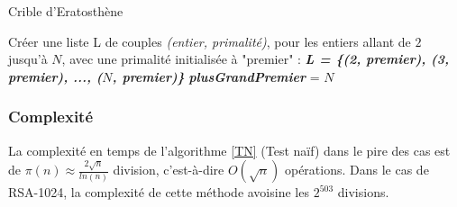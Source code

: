 		\begin{algorithm}[H]
			\caption{Crible d'Eratosthène}\label{Eras}
			{Créer une liste L de couples \textit{(entier, primalité)}, pour les entiers allant de $2$ jusqu'à $N$, avec une primalité initialisée à "premier" : \textit{\textbf{L = \{(2, premier), (3, premier), ..., ($N$, premier)\}}} \;}
			{\textit{\textbf{plusGrandPremier}} = $N$ \;}
		\end{algorithm}	
			
			
		\subsubsection*{Complexité}
			La complexité en temps de l'algorithme \ref{TN} (Test naïf) dans le pire des cas est de $\pi(n) \approx \frac{2\sqrt{n}}{ln(n)}$ division, c'est-à-dire $O(\sqrt{n})$ opérations. Dans le cas de RSA-1024, la complexité de cette méthode avoisine les $2^{503}$ divisions.
			